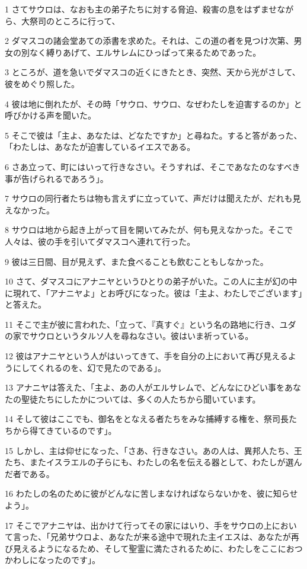 \par 1 さてサウロは、なおも主の弟子たちに対する脅迫、殺害の息をはずませながら、大祭司のところに行って、
\par 2 ダマスコの諸会堂あての添書を求めた。それは、この道の者を見つけ次第、男女の別なく縛りあげて、エルサレムにひっぱって来るためであった。
\par 3 ところが、道を急いでダマスコの近くにきたとき、突然、天から光がさして、彼をめぐり照した。
\par 4 彼は地に倒れたが、その時「サウロ、サウロ、なぜわたしを迫害するのか」と呼びかける声を聞いた。
\par 5 そこで彼は「主よ、あなたは、どなたですか」と尋ねた。すると答があった、「わたしは、あなたが迫害しているイエスである。
\par 6 さあ立って、町にはいって行きなさい。そうすれば、そこであなたのなすべき事が告げられるであろう」。
\par 7 サウロの同行者たちは物も言えずに立っていて、声だけは聞えたが、だれも見えなかった。
\par 8 サウロは地から起き上がって目を開いてみたが、何も見えなかった。そこで人々は、彼の手を引いてダマスコへ連れて行った。
\par 9 彼は三日間、目が見えず、また食べることも飲むこともしなかった。
\par 10 さて、ダマスコにアナニヤというひとりの弟子がいた。この人に主が幻の中に現れて、「アナニヤよ」とお呼びになった。彼は「主よ、わたしでございます」と答えた。
\par 11 そこで主が彼に言われた、「立って、『真すぐ』という名の路地に行き、ユダの家でサウロというタルソ人を尋ねなさい。彼はいま祈っている。
\par 12 彼はアナニヤという人がはいってきて、手を自分の上において再び見えるようにしてくれるのを、幻で見たのである」。
\par 13 アナニヤは答えた、「主よ、あの人がエルサレムで、どんなにひどい事をあなたの聖徒たちにしたかについては、多くの人たちから聞いています。
\par 14 そして彼はここでも、御名をとなえる者たちをみな捕縛する権を、祭司長たちから得てきているのです」。
\par 15 しかし、主は仰せになった、「さあ、行きなさい。あの人は、異邦人たち、王たち、またイスラエルの子らにも、わたしの名を伝える器として、わたしが選んだ者である。
\par 16 わたしの名のために彼がどんなに苦しまなければならないかを、彼に知らせよう」。
\par 17 そこでアナニヤは、出かけて行ってその家にはいり、手をサウロの上において言った、「兄弟サウロよ、あなたが来る途中で現れた主イエスは、あなたが再び見えるようになるため、そして聖霊に満たされるために、わたしをここにおつかわしになったのです」。
